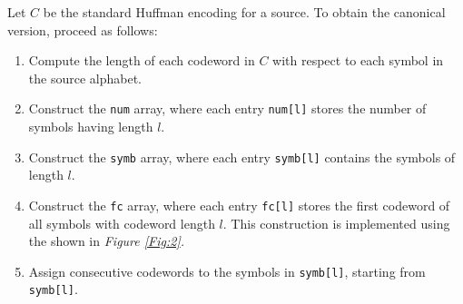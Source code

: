 \documentclass{subfiles}
\begin{document}
    Let \(C\) be the standard Huffman encoding for a source.
    To obtain the canonical version, proceed as follows: 
    \begin{enumerate}
        \item Compute the length of each codeword in \(C\)
            with respect to each symbol in the source alphabet.

        \item Construct the \lstinline{num} array, where each entry \lstinline{num[l]}
            stores the number of symbols having length \(l\).

        \item Construct the \lstinline{symb} array, where each entry \lstinline{symb[l]}
            contains the symbols of length \(l\).

        \item Construct the \lstinline{fc} array, where each entry \lstinline{fc[l]}
            stores the first codeword of all symbols with codeword length \(l\).
            This construction is implemented using the shown in \emph{Figure \ref{Fig:2}.}
        \item Assign consecutive codewords to the symbols in \lstinline{symb[l]},
            starting from \lstinline{symb[l]}.
    \end{enumerate}
\end{document}
